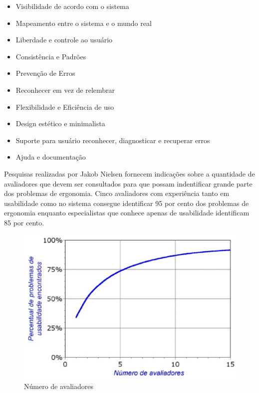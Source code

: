 	\begin{itemize}
		\item{Visibilidade de acordo com o sistema}
		\item{Mapeamento entre o sistema e o mundo real}
		\item{Liberdade e controle ao usuário}
		\item{Consistência e Padrões}
		\item{Prevenção de Erros}
		\item{Reconhecer em vez de relembrar}
		\item{Flexibilidade e Eficiência de uso}
		\item{Design estético e minimalista}
		\item{Suporte para usuário reconhecer, diagnosticar e recuperar erros}
		\item{Ajuda e documentação}
	\end{itemize}


	Pesquisas realizadas por Jakob Nielsen fornecem indicações sobre a quantidade de avaliadores que devem ser consultados para que possam indentificar grande parte dos problemas de ergonomia. Cinco avaliadores com experiência tanto em usabilidade como no sistema consegue identificar 95 por cento dos problemas de ergonomia enquanto especialistas que conhece apenas de usabilidade identificam 85 por cento.

\begin{figure}[h]
    \centering
    \includegraphics[keepaspectratio=true,scale=0.60]
      {figuras/avaliadores_heuristica.eps}
    \caption{Número de avaliadores~\cite{nielsen1994}}
    \label{avaliadores}
\end{figure}

